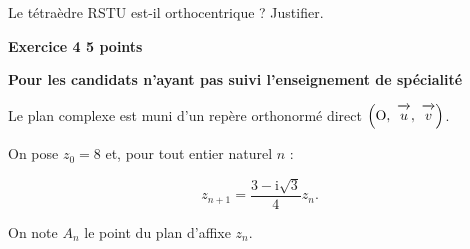 \documentclass[10pt,a4paper]{article}
\newcommand{\vect}[1]{\overrightarrow{\,\mathstrut#1\,}}
\def\Ouv{$\left(\text{O},~\vect{u},~\vect{v}\right)$}
\begin{document}
Le tétraèdre RSTU est-il orthocentrique ? Justifier.

\vspace{0.5cm}

\textbf{Exercice 4 \hfill 5 points}

\textbf{Pour les candidats n'ayant pas suivi l'enseignement de spécialité}

\bigskip

Le plan complexe est muni d'un repère orthonormé direct \Ouv.

On pose $z_0 = 8$ et, pour tout entier naturel $n$ :

\[z_{n+1} = \dfrac{3 - \text{i}\sqrt{3}}{4}z_n.\]

On note $A_n$ le point du plan d'affixe $z_n$.

\medskip
\end{document}
